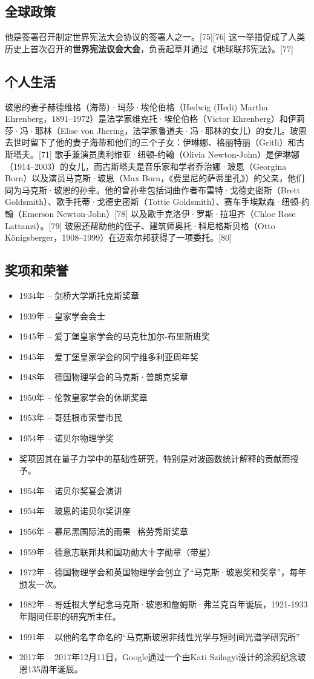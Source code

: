 \subsection{全球政策}  
他是签署召开制定世界宪法大会协议的签署人之一。[75][76] 这一举措促成了人类历史上首次召开的\textbf{世界宪法议会大会}，负责起草并通过《地球联邦宪法》。[77]
\subsection{个人生活}  
玻恩的妻子赫德维格（海蒂）·玛莎·埃伦伯格（Hedwig (Hedi) Martha Ehrenberg，1891–1972）是法学家维克托·埃伦伯格（Victor Ehrenberg）和伊莉莎·冯·耶林（Elise von Jhering，法学家鲁道夫·冯·耶林的女儿）的女儿。玻恩去世时留下了他的妻子海蒂和他们的三个子女：伊琳娜、格丽特丽（Gritli）和古斯塔夫。[71] 歌手兼演员奥利维亚·纽顿-约翰（Olivia Newton-John）是伊琳娜（1914–2003）的女儿，而古斯塔夫是音乐家和学者乔治娜·玻恩（Georgina Born）以及演员马克斯·玻恩（Max Born，《费里尼的萨蒂里孔》）的父亲，他们同为马克斯·玻恩的孙辈。他的曾孙辈包括词曲作者布雷特·戈德史密斯（Brett Goldsmith）、歌手托蒂·戈德史密斯（Tottie Goldsmith）、赛车手埃默森·纽顿-约翰（Emerson Newton-John）[78] 以及歌手克洛伊·罗斯·拉坦齐（Chloe Rose Lattanzi）。[79] 玻恩还帮助他的侄子、建筑师奥托·科尼格斯贝格（Otto Königsberger，1908–1999）在迈索尔邦获得了一项委托。[80]
\subsection{奖项和荣誉}
\begin{itemize}
\item 1934年 – 剑桥大学斯托克斯奖章  
\item 1939年 – 皇家学会会士  
\item 1945年 – 爱丁堡皇家学会的马克杜加尔-布里斯班奖  
\item 1945年 – 爱丁堡皇家学会的冈宁维多利亚周年奖  
\item 1948年 – 德国物理学会的马克斯·普朗克奖章  
\item 1950年 – 伦敦皇家学会的休斯奖章  
\item 1953年 – 哥廷根市荣誉市民  
\item 1954年 – 诺贝尔物理学奖  
  \item 奖项因其在量子力学中的基础性研究，特别是对波函数统计解释的贡献而授予。  
  \item 1954年 – 诺贝尔奖宴会演讲  
  \item 1954年 – 玻恩的诺贝尔奖讲座  
\item 1956年 – 慕尼黑国际法的雨果·格劳秀斯奖章  
\item 1959年 – 德意志联邦共和国功勋大十字勋章（带星）  
\item 1972年 – 德国物理学会和英国物理学会创立了“马克斯·玻恩奖和奖章”，每年颁发一次。  
\item 1982年 – 哥廷根大学纪念马克斯·玻恩和詹姆斯·弗兰克百年诞辰，1921-1933年期间任职的研究所主任。  
\item 1991年 – 以他的名字命名的“马克斯玻恩非线性光学与短时间光谱学研究所”  
\item 2017年 – 2017年12月11日，Google通过一个由Kati Szilagyi设计的涂鸦纪念玻恩135周年诞辰。
\end{itemize}  
